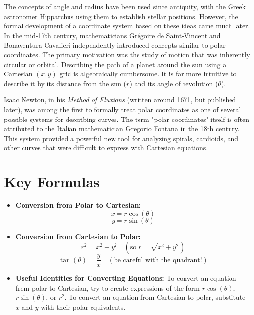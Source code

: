 \documentclass{article}
\begin{document}
The concepts of angle and radius have been used since antiquity, with the Greek astronomer Hipparchus using them to establish stellar positions. However, the formal development of a coordinate system based on these ideas came much later. In the mid-17th century, mathematicians Grégoire de Saint-Vincent and Bonaventura Cavalieri independently introduced concepts similar to polar coordinates. The primary motivation was the study of motion that was inherently circular or orbital. Describing the path of a planet around the sun using a Cartesian \((x, y)\) grid is algebraically cumbersome. It is far more intuitive to describe it by its distance from the sun (\(r\)) and its angle of revolution (\(\theta\)).

Isaac Newton, in his \textit{Method of Fluxions} (written around 1671, but published later), was among the first to formally treat polar coordinates as one of several possible systems for describing curves. The term "polar coordinates" itself is often attributed to the Italian mathematician Gregorio Fontana in the 18th century. This system provided a powerful new tool for analyzing spirals, cardioids, and other curves that were difficult to express with Cartesian equations.

\section{Key Formulas}
\begin{itemize}
    \item \textbf{Conversion from Polar to Cartesian:}
    \[ x = r \cos(\theta) \]
    \[ y = r \sin(\theta) \]

    \item \textbf{Conversion from Cartesian to Polar:}
    \[ r^2 = x^2 + y^2 \quad (\text{so } r = \sqrt{x^2 + y^2}) \]
    \[ \tan(\theta) = \frac{y}{x} \quad (\text{be careful with the quadrant!}) \]

    \item \textbf{Useful Identities for Converting Equations:}
    To convert an equation from polar to Cartesian, try to create expressions of the form \(r\cos(\theta)\), \(r\sin(\theta)\), or \(r^2\).
    To convert an equation from Cartesian to polar, substitute \(x\) and \(y\) with their polar equivalents.
\end{itemize}
\end{document}
